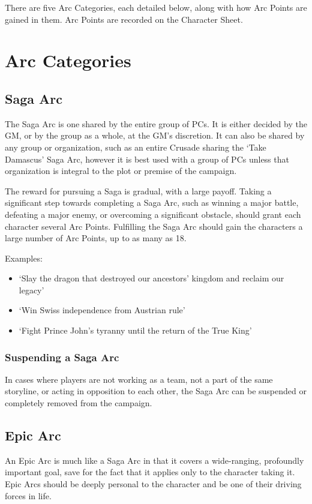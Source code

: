\documentclass[oneside,11pt,english]{book}
\begin{document}
There are five Arc Categories, each detailed below, along with how Arc Points
are gained in them. Arc Points are recorded on the Character Sheet.  
\section{Arc Categories}

\subsection{Saga Arc}
The Saga Arc is one shared by the entire group of PCs. It is either decided by
the GM, or by the group as a whole, at the GM’s discretion. It can also be
shared by any group or organization, such as an entire Crusade sharing the ‘Take
Damascus’ Saga Arc, however it is best used with a group of PCs unless that
organization is integral to the plot or premise of the campaign.  

The reward for pursuing a Saga is gradual, with a large payoff. Taking a
significant step towards completing a Saga Arc, such as winning a major battle,
defeating a major enemy, or overcoming a significant obstacle, should grant each
character several Arc Points. Fulfilling the Saga Arc should gain the characters
a large number of Arc Points, up to as many as 18.  

Examples:
\begin{itemize}
\item ‘Slay the dragon that destroyed our ancestors’ kingdom and reclaim our legacy’ 
\item ‘Win Swiss independence from Austrian rule’ 
\item ‘Fight Prince John’s tyranny until the return of the True King’ 
\end{itemize} 

\subsubsection{Suspending a Saga Arc}
In cases where players are not working as a team, not a part of the same
storyline, or acting in opposition to each other, the Saga Arc can be suspended
or completely removed from the campaign.

\subsection{Epic Arc} 
An Epic Arc is much like a Saga Arc in that it covers a wide-ranging, profoundly
important goal, save for the fact that it applies only to the character taking
it. Epic Arcs should be deeply personal to the character and be one of their
driving forces in life.
\end{document}
